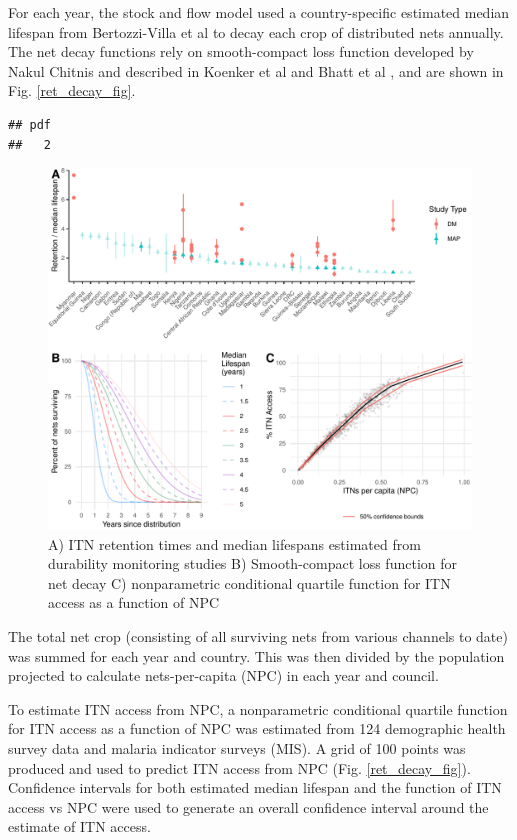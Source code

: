 \documentclass[review,
3p]{elsarticle} %
\begin{document}
For each year, the stock and flow model used a country-specific
estimated median lifespan from Bertozzi-Villa et al
\citep{10.1038/s41467-021-23707-7} to decay each crop of distributed
nets annually. The net decay functions rely on smooth-compact loss
function developed by Nakul Chitnis and described in Koenker et al and
Bhatt et al
\citep{Koenker:2013ed, Bhatt:2015gn, 10.1186/s12936-022-04272-w}, and
are shown in Fig. \ref{ret_decay_fig}.

\begin{verbatim}
## pdf 
##   2
\end{verbatim}

\begin{figure}

{\centering \includegraphics[width=0.8\linewidth]{quant_paper_files/figure-latex/ret_decay_fig-1} 

}

\caption{\label{ret_decay_fig}A) ITN retention times and median lifespans estimated from durability monitoring studies B) Smooth-compact loss function for net decay C) nonparametric conditional quartile function for ITN access as a function of NPC}\label{fig:ret_decay_fig}
\end{figure}

The total net crop (consisting of all surviving nets from various
channels to date) was summed for each year and country. This was then
divided by the population projected to calculate nets-per-capita (NPC)
in each year and council.

To estimate ITN access from NPC, a nonparametric conditional quartile
function for ITN access as a function of NPC was estimated from 124
demographic health survey data and malaria indicator surveys (MIS). A
grid of 100 points was produced and used to predict ITN access from NPC
(Fig. \ref{ret_decay_fig}). Confidence intervals for both estimated
median lifespan and the function of ITN access vs NPC were used to
generate an overall confidence interval around the estimate of ITN
access.
\end{document}
